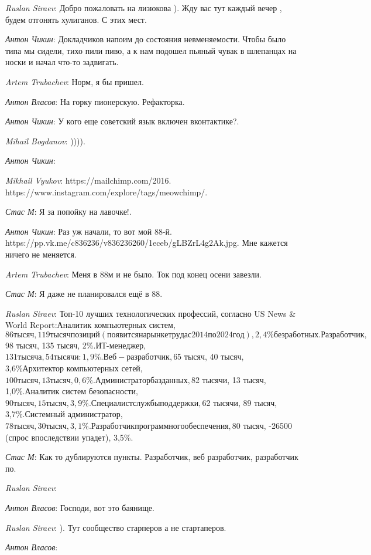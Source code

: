 \documentclass[10pt]{book}
\newcommand{\AUTHOR}[1]{\emph{#1}:}
\begin{document}
\AUTHOR{Ruslan Siraev} Добро пожаловать на лизюкова ). Жду вас тут каждый вечер , будем отгонять хулиганов. С этих мест.

\AUTHOR{Антон Чикин} Докладчиков напоим до состояния невменяемости. Чтобы было типа мы сидели, тихо пили пиво, а к нам подошел пьяный чувак в шлепанцах на носки и начал что-то задвигать.

\AUTHOR{Artem Trubachev} Норм, я бы пришел.

\AUTHOR{Антон Власов} На горку пионерскую. Рефакторка.

\AUTHOR{Антон Чикин}   У кого еще советский язык включен вконтактике?.

\AUTHOR{Mihail Bogdanov} )))).

\AUTHOR{Антон Чикин}

\AUTHOR{Mikhail Vyukov} https://mailchimp.com/2016. https://www.instagram.com/explore/tags/meowchimp/.

\AUTHOR{Стас М} Я за попойку на лавочке!.

\AUTHOR{Антон Чикин} Раз уж начали, то вот мой 88-й. https://pp.vk.me/c836236/v836236260/1eceb/gLBZrL4g2Ak.jpg. Мне кажется ничего не меняется.

\AUTHOR{Artem Trubachev} Меня в 88м и не было. Ток под конец осени завезли.

\AUTHOR{Стас М} Я даже не планировался ещё в 88.

\AUTHOR{Ruslan Siraev} Топ-10 лучших технологических профессий, согласно US News & World Report:Аналитик компьютерных систем, $86 тысяч, 119 тысяч позиций (появится на рынке труда с 2014 по 2024 год), 2,4\% безработных.Разработчик, $98 тысяч, 135 тысяч, 2\%.ИТ-менеджер, $131 тысяча, 54 тысячи: 1,9\%.Веб-разработчик, $65 тысяч, 40 тысяч, 3,6\%Архитектор компьютерных сетей, $100 тысяч, 13 тысяч, 0,6\%.Администратор баз данных, $82 тысячи, 13 тысяч, 1,0\%.Аналитик систем безопасности, $90 тысяч, 15 тысяч, 3,9\%.Специалист службы поддержки, $62 тысячи, 89 тысяч, 3,7\%.Системный администратор, $78 тысяч, 30 тысяч, 3,1\%.Разработчик программного обеспечения, $80 тысяч, -26500 (спрос впоследствии упадет), 3,5\%.

\AUTHOR{Стас М} Как то дублируются пункты. Разработчик, веб разработчик, разработчик по.

\AUTHOR{Ruslan Siraev}

\AUTHOR{Антон Власов} Господи, вот это баянище.

\AUTHOR{Ruslan Siraev} ). Тут сообщество старперов а не стартаперов.

\AUTHOR{Антон Власов}
\end{document}
